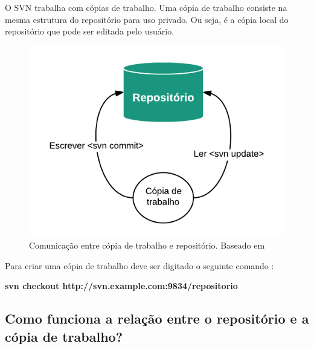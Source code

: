 O SVN trabalha com cópias de trabalho. Uma cópia de trabalho consiste na mesma estrutura do repositório para uso privado. Ou seja, é a cópia local do repositório que pode ser editada pelo usuário. 


\begin{figure}[!htb]
\centering
\includegraphics[scale=1]{figuras/repositorio_copia.png}
\caption{Comunicação entre cópia de trabalho e repositório. Baseado em \cite{svn-book}}
\end{figure}



Para criar uma cópia de trabalho deve ser digitado o seguinte comando \cite{svn-book}:


\begin{centering}
\colorbox{PineGreen}{
\begin{minipage}{320px}
  \textbf{svn checkout http://svn.example.com:9834/repositorio}
\end{minipage}
}

\end{centering}

\subsection{Como funciona a relação entre o repositório e a cópia de trabalho?}

